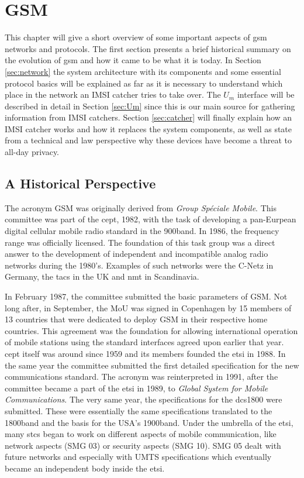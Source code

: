 \chapter{GSM}
\label{ch:gsm}
This chapter will give a short overview of some important aspects of \gls{gsm} networks and protocols.
The first section presents a brief historical summary on the evolution of \gls{gsm} and how it came to be what it is today.
In Section \ref{sec:network} the system architecture with its components and some essential protocol basics will be explained as far as it is necessary to understand which place in the network an IMSI catcher tries to take over.
The $U_m$ interface will be described in detail in Section \ref{sec:Um} since this is our main source for gathering information from IMSI catchers.
Section \ref{sec:catcher} will finally explain how an IMSI catcher works and how it replaces the system components, as well as state from a technical and law perspective why these devices have become a threat to all-day privacy. 
 
\section{A Historical Perspective}
The acronym GSM was originally derived from \emph{Group Sp\'{e}ciale Mobile}.
This committee was part of the \gls{cept}, 1982, with the task of developing a pan-Eurpean digital cellular mobile radio standard in the 900\MHz band.
In 1986, the frequency range was officially licensed.
The foundation of this task group was a direct answer to the development of independent and incompatible analog radio networks during the 1980's.
Examples of such networks were the C-Netz in Germany, the \gls{tacs} in the UK and \gls{nmt} in Scandinavia.

In February 1987, the committee submitted the basic parameters of GSM. 
Not long after, in September, the \gls{MoU} was signed in Copenhagen by 15 members of 13 countries that were dedicated to deploy GSM in their respective home countries.
This agreement was the foundation for allowing international operation of mobile stations using the standard interfaces agreed upon earlier that year.
\gls{cept} itself was around since 1959 and its members founded the \gls{etsi} in 1988.
In the same year the committee submitted the first detailed specification for the new communications standard.
The acronym was reinterpreted in 1991, after the committee became a part of the \gls{etsi} in 1989, to \emph{Global System for Mobile Communications}.
The very same year, the specifications for the \gls{dcs1800} were submitted.
These were essentially the same specifications translated to the 1800\MHz band and the basis for the USA's 1900\MHz band.
Under the umbrella of the \gls{etsi}, many \glspl{stc} began to work on different aspects of mobile communication, like network aspects (SMG 03) or security aspects (SMG 10).
SMG 05 dealt with future networks and especially with UMTS specifications which eventually became an independent body inside the \gls{etsi}.

